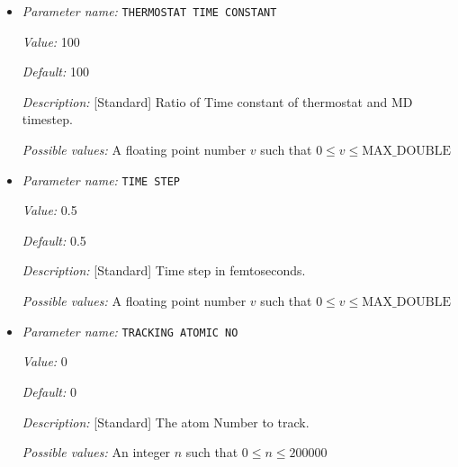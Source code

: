 \begin{itemize}
{\it Value:} NO\_CONTROL


{\it Default:} NO\_CONTROL


{\it Description:} [Standard] Method of controlling temperature in the MD run. NO\_CONTROL is the default option.


{\it Possible values:} Any one of NO\_CONTROL, RESCALE, NOSE\_HOVER\_CHAINS, CSVR
\item {\it Parameter name:} {\tt THERMOSTAT TIME CONSTANT}
\label{parameters:Molecular Dynamics/THERMOSTAT TIME CONSTANT}
\label{parameters:Molecular_20Dynamics/THERMOSTAT_20TIME_20CONSTANT}


{\it Value:} 100


{\it Default:} 100


{\it Description:} [Standard] Ratio of Time constant of thermostat and MD timestep. 


{\it Possible values:} A floating point number $v$ such that $0 \leq v \leq \text{MAX\_DOUBLE}$
\item {\it Parameter name:} {\tt TIME STEP}
\label{parameters:Molecular Dynamics/TIME STEP}
\label{parameters:Molecular_20Dynamics/TIME_20STEP}


{\it Value:} 0.5


{\it Default:} 0.5


{\it Description:} [Standard] Time step in femtoseconds.


{\it Possible values:} A floating point number $v$ such that $0 \leq v \leq \text{MAX\_DOUBLE}$
\item {\it Parameter name:} {\tt TRACKING ATOMIC NO}
\label{parameters:Molecular Dynamics/TRACKING ATOMIC NO}
\label{parameters:Molecular_20Dynamics/TRACKING_20ATOMIC_20NO}


{\it Value:} 0


{\it Default:} 0


{\it Description:} [Standard] The atom Number to track.


{\it Possible values:} An integer $n$ such that $0\leq n \leq 200000$
\end{itemize}

